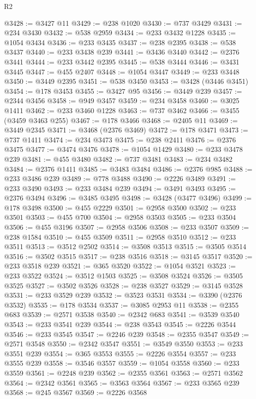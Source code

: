 \begin{lexlean}{R2}
\begin{coremodule}
@3428 := @3427 @11
@3429 := @238 @1020
@3430 := @737 @3429
@3431 := @234 @3430
@3432 := @538 @2959
@3434 := @233 @3432 @1228
@3435 := @1054 @3434
@3436 := @233 @3435
@3437 := @238 @2395
@3438 := @538 @3437
@3440 := @233 @3438 @239
@3441 := @3436 @3440
@3442 := @2376 @3441
@3444 := @233 @3442 @2395
@3445 := @538 @3444
@3446 := @3431 @3445
@3447 := @455 @2407
@3448 := @1054 @3447
@3449 := @233 @3448
@3450 := @3449 @2395
@3451 := @538 @3450
@3453 := @3428 (@3446 @3451)
@3454 := @178 @3453
@3455 := @3427 @95
@3456 := @3449 @239
@3457 := @2344 @3456
@3458 := @949 @3457
@3459 := @234 @3458
@3460 := @3025 @1411
@3462 := @233 @3460 @1228
@3463 := @737 @3462
@3466 := @3455 (@3459 @3463 @255)
@3467 := @178 @3466
@3468 := @2405 @11
@3469 := @3449 @2345
@3471 := @3468 (@2376 @3469)
@3472 := @178 @3471
@3473 := @737 @1411
@3474 := @234 @3473
@3475 := @238 @2411
@3476 := @2376 @3475
@3477 := @3474 @3476
@3478 := @1054 @1429
@3480 := @233 @3478 @239
@3481 := @455 @3480
@3482 := @737 @3481
@3483 := @234 @3482
@3484 := @2376 @1411
@3485 := @3483 @3484
@3486 := @2376 @985
@3488 := @233 @3486 @239
@3489 := @778 @3488
@3490 := @2226 @3489
@3491 := @233 @3490
@3493 := @233 @3484 @239
@3494 := @3491 @3493
@3495 := @2376 @3494
@3496 := @3485 @3495
@3498 := @3428 (@3477 @3496)
@3499 := @178 @3498
@3500 := @455 @2229
@3501 := @2958 @3500
@3502 := @233 @3501
@3503 := @455 @700
@3504 := @2958 @3503
@3505 := @233 @3504
@3506 := @455 @3196
@3507 := @2958 @3506
@3508 := @233 @3507
@3509 := @238 @1584
@3510 := @455 @3509
@3511 := @2958 @3510
@3512 := @233 @3511
@3513 := @3512 @2502
@3514 := @3508 @3513
@3515 := @3505 @3514
@3516 := @3502 @3515
@3517 := @238 @3516
@3518 := @3145 @3517
@3520 := @233 @3518 @239
@3521 := @365 @3520
@3522 := @1054 @3521
@3523 := @233 @3522
@3524 := @3512 @1503
@3525 := @3508 @3524
@3526 := @3505 @3525
@3527 := @3502 @3526
@3528 := @238 @3527
@3529 := @3145 @3528
@3531 := @233 @3529 @239
@3532 := @3523 @3531
@3534 := @3390 (@2376 @3532)
@3535 := @178 @3534
@3537 := @3085 @2953 @11
@3538 := @2355 @683
@3539 := @2571 @3538
@3540 := @2342 @683
@3541 := @3539 @3540
@3543 := @233 @3541 @239
@3544 := @238 @3543
@3545 := @2226 @3544
@3546 := @233 @3545
@3547 := @2246 @239
@3548 := @2355 @3547
@3549 := @2571 @3548
@3550 := @2342 @3547
@3551 := @3549 @3550
@3553 := @233 @3551 @239
@3554 := @365 @3553
@3555 := @2226 @3554
@3557 := @233 @3555 @239
@3558 := @3546 @3557
@3559 := @1054 @3558
@3560 := @233 @3559
@3561 := @2248 @239
@3562 := @2355 @3561
@3563 := @2571 @3562
@3564 := @2342 @3561
@3565 := @3563 @3564
@3567 := @233 @3565 @239
@3568 := @245 @3567
@3569 := @2226 @3568

\end{coremodule}
\end{lexlean}
